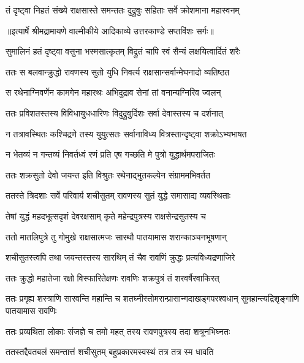 \twolineshloka
{तं दृष्ट्वा निहतं संख्ये राक्षसास्ते समन्ततः}
{दुद्रुवुः सहिताः सर्वे क्रोशमाना महास्वनम्} %


{॥इत्यार्षे श्रीमद्रामायणे वाल्मीकीये आदिकाव्ये उत्तरकाण्डे सप्तविंशः सर्गः॥}


\twolineshloka
{सुमालिनं हतं दृष्ट्वा वसुना भस्मसात्कृतम्}
{विद्रुतं चापि स्वं सैन्यं लक्षयित्वार्दितं शरैः} %

\twolineshloka
{ततः स बलवान्क्रुद्धो रावणस्य सुतो युधि}
{निवर्त्य राक्षसान्सर्वान्मेघनादो व्यतिष्ठत} %

\twolineshloka
{स रथेनाग्निवर्णेन कामगेन महारथः}
{अभिदुद्राव सेनां तां वनान्यग्निरिव ज्वलन्} %

\twolineshloka
{ततः प्रविशतस्तस्य विविधायुधधारिणः}
{विदुद्रुवुर्दिशः सर्वा देवास्तस्य च दर्शनात्} %

\twolineshloka
{न तत्रावस्थितः कश्चिद्रणे तस्य युयुत्सतः}
{सर्वानाविध्य वित्रस्तान्दृष्ट्वा शक्रोऽभ्यभाषत} %

\twolineshloka
{न भेतव्यं न गन्तव्यं निवर्तध्वं रणं प्रति}
{एष गच्छति मे पुत्रो युद्धार्थमपराजितः} %

\twolineshloka
{ततः शक्रसुतो देवो जयन्त इति विश्रुतः}
{रथेनाद्भुतकल्पेन संग्राममभिवर्तत} %

\twolineshloka
{ततस्ते त्रिदशाः सर्वे परिवार्य शचीसुतम्}
{रावणस्य सुतं युद्धे समासाद्य व्यवस्थिताः} %

\twolineshloka
{तेषां युद्धं महदभूत्सदृशं देवरक्षसाम्}
{कृते महेन्द्रपुत्रस्य राक्षसेन्द्रसुतस्य च} %

\twolineshloka
{ततो मातलिपुत्रे तु गोमुखे राक्षसात्मजः}
{सारथौ पातयामास शरान्काञ्चनभूषणान्} %

\twolineshloka
{शचीसुतस्त्वपि तथा जयन्तस्तस्य सारथिम्}
{तं चैव रावणिं क्रुद्धः प्रत्यविध्यद्रणाजिरे} %

\twolineshloka
{ततः क्रुद्धो महातेजा रक्षो विस्फारितेक्षणः}
{रावणिः शक्रपुत्रं तं शरवर्षैरवाकिरत्} %

\threelineshloka
{ततः प्रगृह्य शस्त्राणि सारवन्ति महान्ति च}
{शतघ्नीस्तोमरान्प्रासान्गदाखड्गपरश्वधान्}
{सुमहान्त्यद्रिशृङ्गाणि पातयामास रावणिः} %

\twolineshloka
{ततः प्रव्यथिता लोकाः संजज्ञे च तमो महत्}
{तस्य रावणपुत्रस्य तदा शत्रूनभिघ्नतः} %

\twolineshloka
{ततस्तद्दैवतबलं समन्तात्तं शचीसुतम्}
{बहुप्रकारमस्वस्थं तत्र तत्र स्म धावति} %


